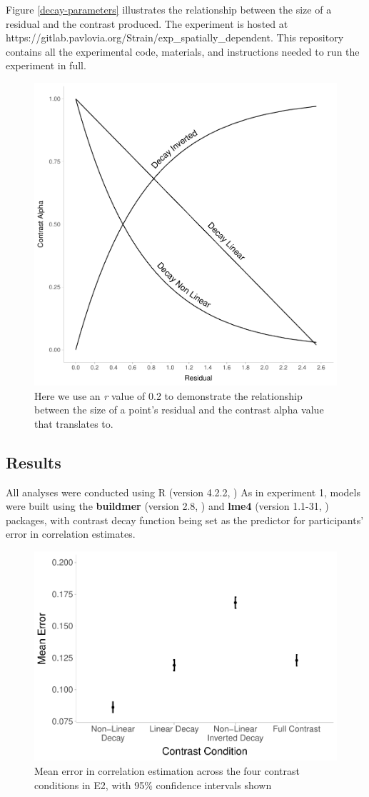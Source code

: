 \documentclass[preprint, 3p,
authoryear]{elsarticle} %
\begin{document}
Figure \ref{decay-parameters} illustrates the relationship between the
size of a residual and the contrast produced. The experiment is hosted
at https://gitlab.pavlovia.org/Strain/exp\_spatially\_dependent. This
repository contains all the experimental code, materials, and
instructions needed to run the experiment in full.

\begin{figure}

\includegraphics[width=0.5\linewidth]{contrast_and_scatterplots_files/figure-latex/decay-parameters-1} \hfill{}

\caption{\label{decay-parameters}Here we use an \textit{r} value of 0.2 to demonstrate the relationship between the size of a point's residual and the contrast alpha value that translates to.}\label{fig:decay-parameters}
\end{figure}

\hypertarget{results-1}{%
\subsection{Results}\label{results-1}}

All analyses were conducted using R (version 4.2.2, \citealp{r_core}) As
in experiment 1, models were built using the \textbf{buildmer} (version
2.8, \citealp{voeten_buildmer_2022}) and \textbf{lme4} (version 1.1-31,
\citealp{bates_lme4_2015}) packages, with contrast decay function being
set as the predictor for participants' error in correlation estimates.

\begin{figure}

\includegraphics[width=0.5\linewidth]{contrast_and_scatterplots_files/figure-latex/e2-dot-plot-1} \hfill{}

\caption{\label{e2-dot-plot}Mean error in correlation estimation across the four contrast conditions in E2, with 95\% confidence intervals shown}\label{fig:e2-dot-plot}
\end{figure}
\end{document}
